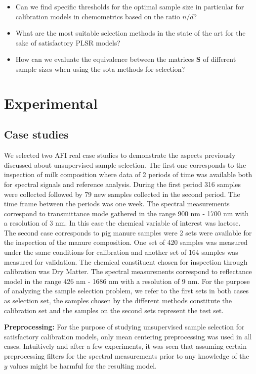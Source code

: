 \documentclass{article}
\begin{document}
\begin{itemize}
    \item Can we find specific thresholds for the optimal sample size in particular for calibration models in chemometrics based on the ratio $n/d$?
    \item What are the most suitable selection methods in the state of the art for the sake of satisfactory PLSR models?
    \item How can we evaluate the equivalence between the matrices $\mathbf{S}$ of different sample sizes when using the sota methods for selection?
\end{itemize}

\section*{Experimental}\label{experimental}

\subsection*{Case studies}\label{data}

We selected two AFI real case studies to demonstrate the aspects previously discussed about unsupervised sample selection. The first one corresponds to the inspection of milk composition where data of 2 periods of time was available both for spectral signals and reference analysis. During the first period 316 samples were collected followed by 79 new samples collected in the second period. The time frame between the periods was one week. The spectral measurements correspond to transmittance mode gathered in the range 900 nm - 1700 nm with a resolution of 3 nm. In this case the chemical variable of interest was lactose. 
The second case corresponds to pig manure samples were 2 sets were available for the inspection of the manure composition. One set of 420 samples was measured under the same conditions for calibration and another set of 164 samples was measured for validation. The chemical constituent chosen for inspection through calibration was Dry Matter. The spectral measurements correspond to reflectance model in the range 426 nm - 1686 nm with a resolution of 9 nm.
For the purpose of analyzing the sample selection problem, we refer to the first sets in both cases as selection set, the samples chosen by the different methods constitute the calibration set and the samples on the second sets represent the test set. 

\textbf{Preprocessing:} For the purpose of studying unsupervised sample selection for satisfactory calibration models, only mean centering preprocessing was used in all cases. Intuitively and after a few experiments, it was seen that assuming certain preprocessing filters for the spectral measurements prior to any knowledge of the $y$ values might be harmful for the resulting model.
\end{document}
